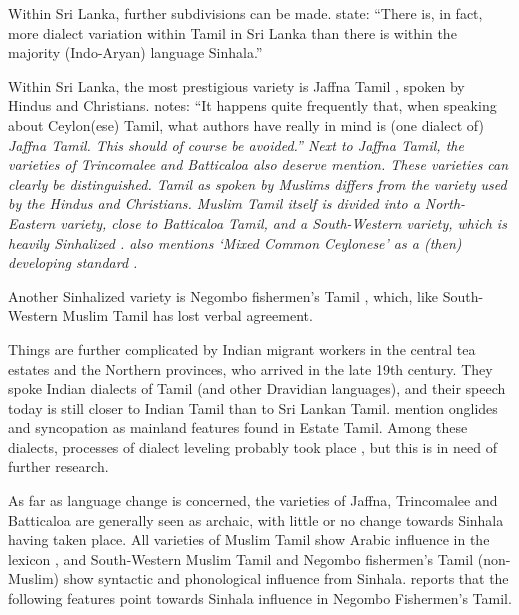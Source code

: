 \documentclass{article}
\begin{document}
Within Sri Lanka, further subdivisions can be made.   \citet[170f]{Gairdonotuse} state: ``There is, in fact, more dialect variation within  Tamil in Sri Lanka than there is within the majority (Indo-Aryan) language Sinhala.''
 

Within Sri Lanka, the most prestigious variety is Jaffna Tamil \citep{Zvelebil1959II,Kuiper1962,Pillai1962,Zvelebil1966,Gairdonotuse,GairEtAl2005spokenTamil, Suseendirarajah1993}, spoken by Hindus and Christians. \citet[137]{Zvelebil1966} notes:  ``It happens  quite frequently that, when speaking about  Ceylon(ese) Tamil, what authors have really in mind is (one dialect of) \em Jaffna \em Tamil. This should of course be avoided.'' Next to Jaffna Tamil, the varieties of Trincomalee \citep{Zvelebil1959I,Zvelebil1966} and Batticaloa \citep{Zvelebil1966,Batticaloa} also deserve mention. These varieties can clearly be distinguished. Tamil as spoken by Muslims differs from the variety used by the Hindus and Christians. Muslim Tamil itself is divided into a North-Eastern variety, close to Batticaloa Tamil, and a South-Western variety, which is heavily Sinhalized \citep{Nuhman2007}. \citet{Zvelebil1959II,Zvelebil1966} also mentions `Mixed Common Ceylonese' as a (then) developing standard \citep[
also cf.][]{
GairEtAl2005spokenTamil}.


Another Sinhalized variety is Negombo fishermen's Tamil \citep{Bonta2004,Bonta2010}, which, like South-Western Muslim Tamil has lost verbal agreement. 

Things are further complicated by Indian migrant workers in the central tea estates and the Northern provinces, who arrived in the late 19th century. They spoke Indian dialects of Tamil (and other Dravidian languages), and their speech today is still closer to Indian Tamil than to Sri Lankan Tamil. \citet{Gairdonotuse} mention onglides and syncopation as mainland features found in Estate Tamil.  Among these dialects, processes of dialect leveling probably took place \citep{Wijeratne2005}, but this is in need of further research. 

As far as language change is concerned, the varieties of Jaffna, Trincomalee and Batticaloa are generally seen as archaic, with little or no change towards Sinhala having taken place. All varieties of Muslim Tamil show Arabic influence in the lexicon \citep{Nuhman2007}, and South-Western Muslim Tamil and Negombo fishermen's Tamil (non-Muslim) show syntactic and phonological influence from Sinhala. \citet{Bonta2010} reports that the following features point towards Sinhala influence in Negombo Fishermen's Tamil. 
\end{document}
